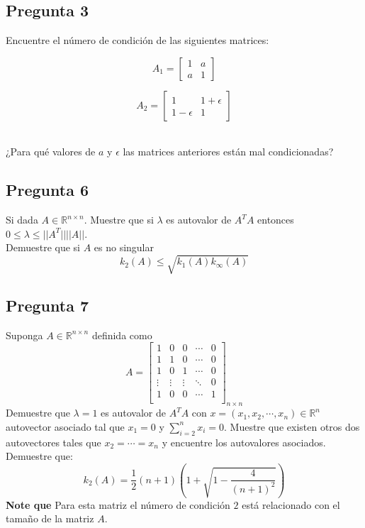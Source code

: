 \documentclass{article}
\def\R{\mbox{\(\mathbb{R}\)}}
\begin{document}
\subsection*{Pregunta 3}
Encuentre el número de condición de las siguientes matrices:\\
\begin{figure}[h!]
\begin{minipage}{4cm}
\center
$$
A_1 =  
\begin{bmatrix}
1 & a\\
a & 1
\end{bmatrix}$$
\end{minipage}
\begin{minipage}{4cm}
$$A_2 =
\begin{bmatrix}
1 & 1 + \epsilon\\
1 - \epsilon & 1
\end{bmatrix}$$
\end{minipage}
\end{figure}
\\
¿Para qué valores de $a$ y $\epsilon$ las matrices anteriores están mal condicionadas?
\subsection*{Pregunta 6}
Si dada $A \in \mathbb{R}^{n\times n}$. Muestre que si $\lambda$ es autovalor de $A^{T}A$ entonces $0\leq \lambda\leq ||A^{T}|| ||A||$.\\
Demuestre que si $A$ es no singular
$$k_2(A) \leq \sqrt{k_1(A)k_\infty(A)} $$
\subsection*{Pregunta 7}
Suponga $A \in \mathbb{R}^{n\times n}$ definida como
$$A =
\begin{bmatrix}
1&0&0&\cdots &0\\
1&1&0&\cdots &0\\
1&0&1&\cdots &0\\
\vdots&\vdots&\vdots&\ddots& 0\\
1&0&0&\cdots &1\\
\end{bmatrix}_{n\times n}
$$
Demuestre que $\lambda =1$ es autovalor de $A^{T}A$ con $x = (x_1, x_2, \cdots, x_n)\in \R^n$ autovector asociado tal que $x_1 = 0$ y $\sum_{i=2}^{n}x_i = 0$. Muestre que existen otros dos autovectores tales que $x_2 = \cdots = x_n$ y encuentre los autovalores asociados. Demuestre que:
$$ k_2(A) = \frac{1}{2}(n+1)\left(1+\sqrt{1-\frac{4}{(n+1)^{2}}}\right)$$
{\bf Note que} Para esta matriz el número de condición $2$ está relacionado con el tamaño de la matriz $A$.
\end{document}
